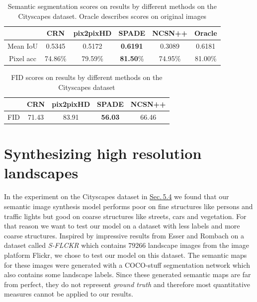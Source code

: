 \begin{table}[] \label{tab:5.4}
    \centering
    \begin{tabular}{ccccc|c}
         \toprule
         &  CRN \cite{crn} & pix2pixHD \cite{pix2pixHD} & SPADE \cite{spade} & NCSN++ \cite{score_3} & Oracle\\
         \midrule
        Mean IoU & 0.5345 & 0.5172 & \textbf{0.6191} & 0.3089 & 0.6181\\
        Pixel acc & 74.86\% & 79.59\% & \textbf{81.50}\% & 74.95\% & 81.00\%\\
        \bottomrule
    \end{tabular}
    \caption[Semantic segmentation scores on Cityscapes dataset]{Semantic segmentation scores on results by different
methods on the Cityscapes dataset. Oracle describes scores on original images}
    \label{tab:my_label}
\end{table}

\begin{table}[] \label{tab:5.5}
    \centering
    \begin{tabular}{ccccc}
        \toprule
         &  CRN \cite{crn} & pix2pixHD \cite{pix2pixHD} & SPADE \cite{spade} & NCSN++ \cite{score_3}\\
         \midrule
         FID & 71.43 & 83.91 & \textbf{56.03} & 66.46\\
         \bottomrule
    \end{tabular}
    \caption[FID scores on results by different methods on the Cityscapes dataset]{FID scores on results by different methods on the Cityscapes dataset}
    \label{tab:my_label}
\end{table}



\section[Synthesizing high resolution landscapes]{Synthesizing high resolution landscapes%
    } \label{sec:5.5}
In the experiment on the Cityscapes dataset in \hyperref[sec:5.4]{Sec.\,5.4} we found that our semantic image synthesis model performs poor on fine structures like persons and traffic lights but good on coarse structures like streets, cars and vegetation. For that reason we want to test our model on a dataset with less labels and more coarse structures. Inspired by impressive results from Esser and Rombach \cite{taming} on a dataset called \textit{S-FLCKR} which contains $79266$ landscape images from the image platform Flickr, we chose to test our model on this dataset. The semantic maps for these images were generated with a COCO-stuff \cite{coco_stuff} segmentation network which also contains some landscape labels. Since these generated semantic maps are far from perfect, they do not represent \textit{ground truth} and therefore most quantitative measures cannot be applied to our results.

